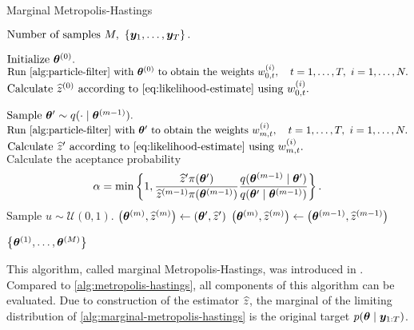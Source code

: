 \begin{algorithm}[ht]
    \caption{Marginal Metropolis-Hastings}
    \label{alg:marginal-metropolis-hastings}
    \begin{algorithmic}[1]
        \Input $\text{Number of samples } M,\ \left\{\by_1, \ldots, \by_T\right\}.$
        
        \State $\text{Initialize } \bm{\theta}^{(0)}.$
        \State $\text{Run \autoref{alg:particle-filter} with } \btheta^{(0)} \text{ to obtain the weights } w_{0,t}^{(i)}, \quad t = 1, \ldots, T,\ i = 1, \ldots, N.$
        \State $\text{Calculate } \widehat{z}^{(0)} \text{ according to \eqref{eq:likelihood-estimate} using } w_{0,t}^{(i)}.$
        
        \State $\text{Sample } \bm{\theta}^\prime \sim q(\cdot \mid \bm{\theta}^{(m-1)}).$
        \State $\text{Run \autoref{alg:particle-filter} with } \btheta^\prime \text{ to obtain the weights } w_{m,t}^{(i)}, \quad t = 1, \ldots, T, \ i = 1, \ldots, N.$
        \State $\text{Calculate } \widehat{z}^\prime \text{ according to \eqref{eq:likelihood-estimate} using } w_{m,t}^{(i)}.$
        \State $\text{Calculate the aceptance probability } $ \begin{equation*} \label{eq:acceptance-probability-tractable}
        \alpha = \min \left\{1, \frac{\widehat{z}^\prime \pi(\bm{\theta}^\prime)}{\widehat{z}^{(m-1)} \pi(\bm{\theta}^{(m-1)})} \frac{q(\bm{\theta}^{(m-1)} \mid \bm{\theta}^\prime)}{q(\bm{\theta}^\prime \mid \bm{\theta}^{(m-1)})} \right\}.
        \end{equation*}
        \State $\text{Sample } u \sim \mathcal{U}(0,1).$
        \State $\left( \bm{\theta}^{(m)}, \widehat{z}^{(m)} \right) \gets \left( \bm{\theta}^\prime, \widehat{z}^\prime \right)$ 
        \Else
        \State $\left( \bm{\theta}^{(m)}, \widehat{z}^{(m)} \right) \gets \left( \bm{\theta}^{(m-1)}, \widehat{z}^{(m-1)} \right)$ 
        \EndIf
        \EndFor
        
        \Output $\left\{ \bm{\theta}^{(1)}, \ldots, \bm{\theta}^{(M)} \right\}$
    \end{algorithmic}
\end{algorithm}

This algorithm, called marginal Metropolis-Hastings, was introduced in \cite{andrieu}. Compared to \autoref{alg:metropolis-hastings}, all components of this algorithm can be evaluated. Due to construction of the estimator $\widehat{z}$, the marginal of the limiting distribution of \autoref{alg:marginal-metropolis-hastings} is the original target $p(\bm{\theta} \mid \bm{y}_{1:T})$.